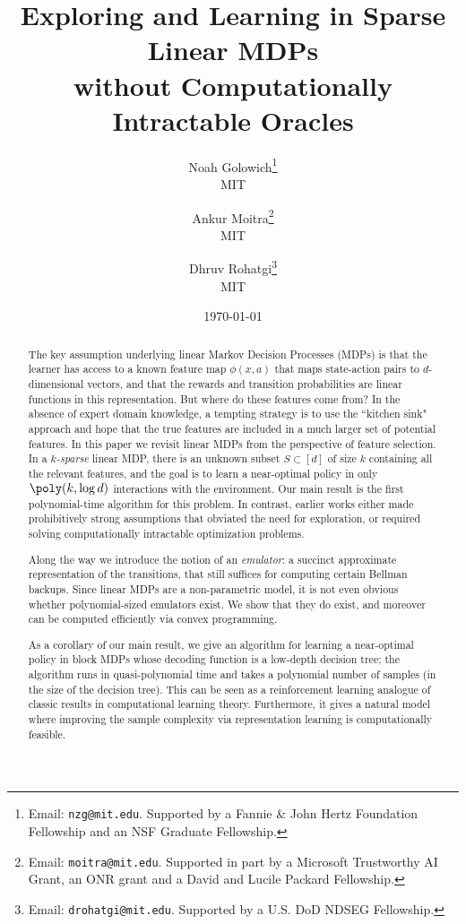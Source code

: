\documentclass[11pt, oneside]{article}
\title{Exploring and Learning in Sparse Linear MDPs \\ without Computationally Intractable Oracles}
\author{Noah Golowich\thanks{Email: \texttt{nzg@mit.edu}. Supported by a Fannie \& John Hertz Foundation Fellowship and an NSF Graduate Fellowship.} \\ MIT \and Ankur Moitra\thanks{Email: \texttt{moitra@mit.edu}. Supported in part by a Microsoft Trustworthy AI Grant, an ONR grant and a David and Lucile Packard Fellowship.} \\ MIT \and Dhruv Rohatgi\thanks{Email: \texttt{drohatgi@mit.edu}. Supported by a U.S. DoD NDSEG Fellowship.} \\ MIT}
\date{\today}
\theoremstyle{plain}
\theoremstyle{definition}
\numberwithin{theorem}{section}
\renewcommand{\^}[1]{^{(#1)}}
\begin{document}
\maketitle

\begin{abstract}



The key assumption underlying linear Markov Decision Processes (MDPs) is that the learner has access to a known feature map $\phi(x, a)$ that maps state-action pairs to $d$-dimensional vectors, and that the rewards and transition probabilities are linear functions in this representation. But where do these features come from? In the absence of expert domain knowledge, a tempting strategy is to use the ``kitchen sink" approach and hope that the true features are included in a much larger set of potential features. In this paper we revisit linear MDPs from the perspective of feature selection. In a \emph{$k$-sparse} linear MDP, there is an unknown subset $S \subset [d]$ of size $k$ containing all the relevant features, and the goal is to learn a near-optimal policy in only $\poly(k,\log d)$ interactions with the environment. Our main result is the first polynomial-time algorithm for this problem. In contrast, earlier works either made prohibitively strong assumptions that obviated the need for exploration, or required solving computationally intractable optimization problems. 

Along the way we introduce the notion of an \emph{emulator}: a succinct approximate representation of the transitions, that still suffices for computing certain Bellman backups.
Since linear MDPs are a non-parametric model, it is not even obvious whether polynomial-sized emulators exist. We show that they do exist, and moreover can be computed efficiently via convex programming.

As a corollary of our main result, we give an algorithm for learning a near-optimal policy in block MDPs whose decoding function is a low-depth decision tree; the algorithm runs in quasi-polynomial time and takes a polynomial number of samples (in the size of the decision tree). This can be seen as a reinforcement learning analogue of classic results in computational learning theory. Furthermore, it gives a natural model where improving the sample complexity via representation learning is computationally feasible. 



\end{abstract}
\end{document}
